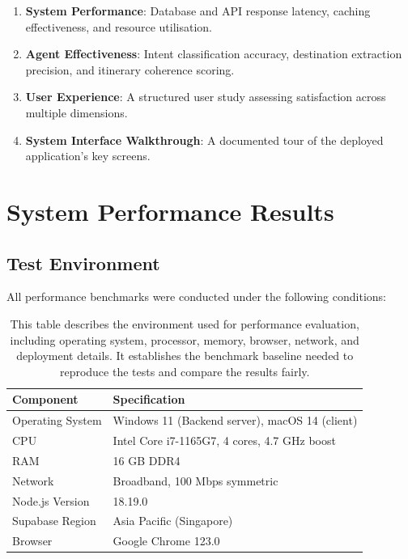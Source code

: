 \documentclass[12pt,a4paper]{report}
\newcommand{\tableexpl}[1]{\caption*{\small #1}}
\begin{document}
\begin{enumerate}[nosep]
  \item \textbf{System Performance}: Database and API response latency, caching effectiveness, and resource utilisation.
  \item \textbf{Agent Effectiveness}: Intent classification accuracy, destination extraction precision, and itinerary coherence scoring.
  \item \textbf{User Experience}: A structured user study assessing satisfaction across multiple dimensions.
  \item \textbf{System Interface Walkthrough}: A documented tour of the deployed application's key screens.
\end{enumerate}

\section{System Performance Results}

\subsection{Test Environment}

All performance benchmarks were conducted under the following conditions:

\begin{table}[H]
\centering
\caption{Benchmark Test Environment Specification}
\tableexpl{This table describes the environment used for performance evaluation, including operating system, processor, memory, browser, network, and deployment details. It establishes the benchmark baseline needed to reproduce the tests and compare the results fairly.}
\label{tab:test_env}
\begin{tabular}{ll}
\toprule
\textbf{Component} & \textbf{Specification} \\
\midrule
Operating System    & Windows 11 (Backend server), macOS 14 (client) \\
CPU                 & Intel Core i7-1165G7, 4 cores, 4.7 GHz boost \\
RAM                 & 16 GB DDR4 \\
Network             & Broadband, 100 Mbps symmetric \\
Node.js Version     & 18.19.0 \\
Supabase Region     & Asia Pacific (Singapore) \\
Browser             & Google Chrome 123.0 \\
\bottomrule
\end{tabular}
\end{table}
\end{document}
